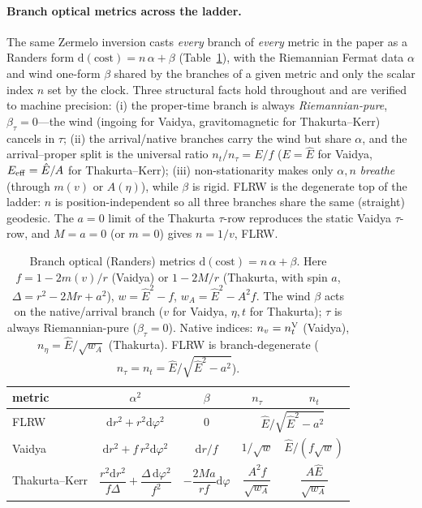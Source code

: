 \documentclass[
    aps, prd, twocolumn, superscriptaddress,
    showpacs, nofootinbib, floatfix
]{revtex4-2}
\newcommand{\Ehat}{\hat E}
\newcommand{\dd}{\mathrm{d}}
\begin{document}
\paragraph{Branch optical metrics across the ladder.} The same Zermelo inversion
casts \emph{every} branch of \emph{every} metric in the paper as a Randers form
$\dd(\text{cost})=n\,\alpha+\beta$ (Table~\ref{tab:optical}), with the Riemannian
Fermat data $\alpha$ and wind one-form $\beta$ shared by the branches of a given
metric and only the scalar index $n$ set by the clock. Three structural facts
hold throughout and are verified to machine precision: (i) the proper-time branch
is always \emph{Riemannian-pure}, $\beta_\tau=0$---the wind (ingoing for Vaidya,
gravitomagnetic for Thakurta--Kerr) cancels in $\tau$; (ii) the arrival/native
branches carry the wind but share $\alpha$, and the arrival--proper split is the
universal ratio $n_t/n_\tau=E/f$ ($E=\Ehat$ for Vaidya, $E_{\rm eff}=\Ehat/A$ for
Thakurta--Kerr); (iii) non-stationarity makes only $\alpha,n$ \emph{breathe}
(through $m(v)$ or $A(\eta)$), while $\beta$ is rigid. FLRW is the degenerate top
of the ladder: $n$ is position-independent so all three branches share the same
(straight) geodesic. The $a=0$ limit of the Thakurta $\tau$-row reproduces the
static Vaidya $\tau$-row, and $M=a=0$ (or $m=0$) gives $n=1/v$, FLRW.

\begin{table}[t]
    \centering
    \caption{Branch optical (Randers) metrics $\dd(\text{cost})=n\,\alpha+\beta$.
    Here $f=1-2m(v)/r$ (Vaidya) or $1-2M/r$ (Thakurta, with spin $a$,
    $\Delta=r^2-2Mr+a^2$), $w=\Ehat^2-f$, $w_A=\Ehat^2-A^2f$. The wind $\beta$
    acts on the native/arrival branch ($v$ for Vaidya, $\eta,t$ for Thakurta);
    $\tau$ is always Riemannian-pure ($\beta_\tau=0$). Native indices:
    $n_v=n_t^{\rm V}$ (Vaidya), $n_\eta=\Ehat/\sqrt{w_A}$ (Thakurta). FLRW is
    branch-degenerate ($n_\tau=n_t=\Ehat/\sqrt{\Ehat^2-a^2}$).}
    \label{tab:optical}
    \begin{ruledtabular}
    \begin{tabular}{lcccc}
    metric & $\alpha^2$ & $\beta$ & $n_\tau$ & $n_t$ \\
    \hline
    FLRW & $\dd r^2+r^2\dd\varphi^2$ & $0$
      & \multicolumn{2}{c}{$\Ehat/\sqrt{\Ehat^2-a^2}$} \\[2pt]
    Vaidya & $\dd r^2+f\,r^2\dd\varphi^2$ & $\dd r/f$
      & $1/\sqrt{w}$ & $\Ehat/(f\sqrt{w})$ \\[2pt]
    Thakurta--Kerr
      & $\dfrac{r^2\dd r^2}{f\Delta}+\dfrac{\Delta\,\dd\varphi^2}{f^2}$
      & $-\dfrac{2Ma}{rf}\dd\varphi$
      & $\dfrac{A^2 f}{\sqrt{w_A}}$ & $\dfrac{A\Ehat}{\sqrt{w_A}}$ \\[3pt]
    \end{tabular}
    \end{ruledtabular}
\end{table}
\end{document}

